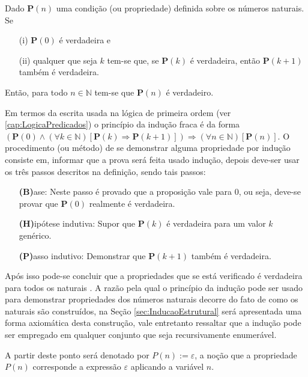 \begin{definicao}\label{def:InducaoFraca}
	Dado \textbf{P}$(n)$ uma condição (ou propriedade) definida sobre os números naturais. Se
	\begin{itemize}
		\item[(i)] \textbf{P}$(0)$ é verdadeira e
		\item[(ii)] qualquer que seja $k$ tem-se que, se \textbf{P}$(k)$ é verdadeira, então \textbf{P}$(k + 1)$ também é verdadeira. 
	\end{itemize}
	Então, para todo $n \in \mathbb{N}$  tem-se que $\textbf{P}(n)$ é verdadeiro.
\end{definicao}

Em termos da escrita usada na lógica de primeira ordem (ver \ref{cap:LogicaPredicados}) o princípio da indução fraca é da forma $(\textbf{P}(0) \land (\forall k \in \mathbb{N})[\textbf{P}(k) \Rightarrow \textbf{P}(k+1)]) \Rightarrow (\forall n \in \mathbb{N})[\textbf{P}(n)]$.  O procedimento (ou método) de se demonstrar alguma propriedade por indução consiste em,  informar que a prova será feita usado indução, depois deve-ser usar os três passos descritos na definição, sendo tais passos:

\begin{itemize}
	\item[ ] \textbf{(B)}ase: Neste passo é provado que a proposição vale para $0$, ou seja, deve-se provar que $\textbf{P}(0)$ realmente é verdadeira.
	\item[ ] \textbf{(H)}ipótese indutiva: Supor que $\textbf{P}(k)$ é verdadeira para um valor $k$ genérico.
	\item[ ] \textbf{(P)}asso indutivo: Demonstrar que $\textbf{P}(k + 1)$ também é verdadeira.
\end{itemize}

Após isso pode-se concluir que a propriedades que se está verificado é verdadeira para todos os naturais \cite{carmo2013}. A razão pela qual o princípio da indução pode ser usado para demonstrar propriedades dos números naturais decorre do fato de como os naturais são construídos, na Seção \ref{sec:InducaoEstrutural} será apresentada uma forma axiomática desta construção, vale entretanto ressaltar que a indução pode ser empregado em qualquer conjunto que seja recursivamente enumerável.

\begin{nota}
	A partir deste ponto será denotado por $P(n) :=  \varepsilon$, a noção que a propriedade $P(n)$ corresponde a expressão $\varepsilon$ aplicando a variável $n$.
\end{nota}

